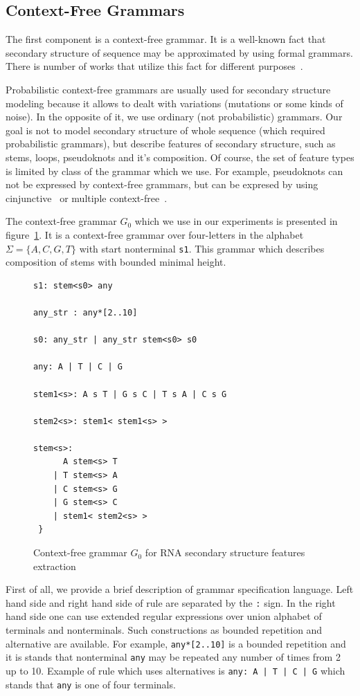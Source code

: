 \documentclass[a4paper,twoside]{article}
\begin{document}
\subsection{Context-Free Grammars}

\noindent The first component is a context-free grammar. 
It is a well-known fact that secondary structure of sequence may be approximated by using formal grammars.
There is number of works that utilize this fact for different purposes~\cite{!!!!}.

Probabilistic context-free grammars are usually used for secondary structure modeling because it allows to dealt with variations (mutations or some kinds of noise).
In the opposite of it, we use ordinary (not probabilistic) grammars.
Our goal is not to model secondary structure of whole sequence (which required probabilistic grammars), but describe features of secondary structure, such as stems, loops, pseudoknots and it's composition.
Of course, the set of feature types is limited by class of the grammar which we use.
For example, pseudoknots can not be expressed by context-free grammars, but can be expresed by using cinjunctive~\cite{KanchanDevi2017,zier2013rna,Okhotin:2001:CG:543313.543323} or multiple context-free~\cite{SEKI1991191,Riechert:2016:ADP:2972703.2972851}.

The context-free grammar $G_0$ which we use in our experiments is presented in figure~\ref{fig:cfg-rna}.
It is a context-free grammar over four-letters in the alphabet $\Sigma=\{A,C,G,T\}$ with start nonterminal \verb|s1|.
This grammar which describes composition of stems with bounded minimal height.

\begin{figure}
\begin{verbatim}
s1: stem<s0> any

any_str : any*[2..10]

s0: any_str | any_str stem<s0> s0

any: A | T | C | G

stem1<s>: A s T | G s C | T s A | C s G 

stem2<s>: stem1< stem1<s> >

stem<s>:  
      A stem<s> T 
    | T stem<s> A 
    | C stem<s> G 
    | G stem<s> C 
    | stem1< stem2<s> >  
 } 
\end{verbatim}
\caption{Context-free grammar $G_0$ for RNA secondary structure features extraction}
\label{fig:cfg-rna}
\end{figure}

First of all, we provide a brief description of grammar specification language.
Left hand side and right hand side of rule are separated by the \verb|:| sign.
In the right hand side one can use extended regular expressions over union alphabet of terminals and nonterminals.
Such constructions as bounded repetition and alternative are available.
For example, \verb|any*[2..10]| is a bounded repetition and it is stands that nonterminal \verb|any| may be repeated any number of times from 2 up to 10.
Example of rule which uses alternatives is \texttt{any: A | T | C | G} which stands that \verb|any| is one of four terminals.
\end{document}
